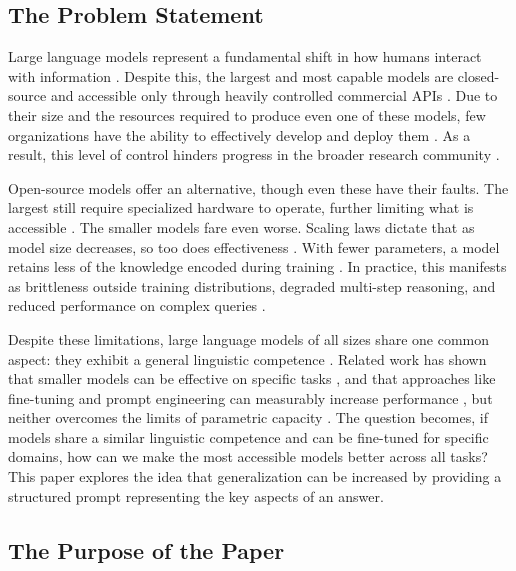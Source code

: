\documentclass{article}
\begin{document}
\subsection{The Problem Statement}

Large language models represent a fundamental shift in how humans interact with information \cite{eloundou2023gpts, llm_critical_societal2024, llmoverview2023}. Despite this, the largest and most capable models are closed-source and accessible only through heavily controlled commercial APIs \cite{liesenfeld2024closed}. Due to their size and the resources required to produce even one of these models, few organizations have the ability to effectively develop and deploy them \cite{strubell2019energy, slm_survey2024}. As a result, this level of control hinders progress in the broader research community \cite{kapoor2024societal}.

Open-source models offer an alternative, though even these have their faults. The largest still require specialized hardware to operate, further limiting what is accessible \cite{slm_survey2024}. The smaller models fare even worse. Scaling laws dictate that as model size decreases, so too does effectiveness \cite{kaplan2020scaling}. With fewer parameters, a model retains less of the knowledge encoded during training \cite{costofdownscaling2023}. In practice, this manifests as brittleness outside training distributions, degraded multi-step reasoning, and reduced performance on complex queries \cite{costofdownscaling2023}.

Despite these limitations, large language models of all sizes share one common aspect: they exhibit a general linguistic competence \cite{linguistic_competence_scale2025, emergent_reducedscale2024, costofdownscaling2023}. Related work has shown that smaller models can be effective on specific tasks \cite{smalllmsready2024, modelsizematters2024}, and that approaches like fine-tuning and prompt engineering can measurably increase performance \cite{hu2022lora, wei2022cot}, but neither overcomes the limits of parametric capacity \cite{kaplan2020scaling, costofdownscaling2023}. The question becomes, if models share a similar linguistic competence and can be fine-tuned for specific domains, how can we make the most accessible models better across all tasks? This paper explores the idea that generalization can be increased by providing a structured prompt representing the key aspects of an answer.

\subsection{The Purpose of the Paper}
\end{document}
